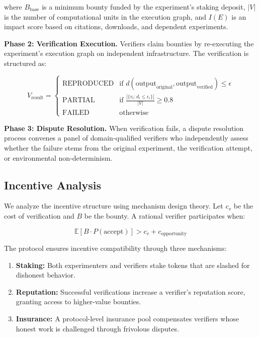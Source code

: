 \documentclass[11pt,a4paper]{article}
\begin{document}
\noindent where $B_{\text{base}}$ is a minimum bounty funded by the experiment's staking deposit, $|V|$ is the number of computational units in the execution graph, and $I(E)$ is an impact score based on citations, downloads, and dependent experiments.

\textbf{Phase 2: Verification Execution.}
Verifiers claim bounties by re-executing the experiment's execution graph on independent infrastructure.
The verification is structured as:

\begin{equation}
    V_{\text{result}} = \begin{cases}
        \text{REPRODUCED} & \text{if } d(\text{output}_{\text{original}}, \text{output}_{\text{verified}}) \leq \epsilon \\
        \text{PARTIAL} & \text{if } \frac{|\{v_i : d_i \leq \epsilon_i\}|}{|V|} \geq 0.8 \\
        \text{FAILED} & \text{otherwise}
    \end{cases}
\end{equation}

\textbf{Phase 3: Dispute Resolution.}
When verification fails, a dispute resolution process convenes a panel of domain-qualified verifiers who independently assess whether the failure stems from the original experiment, the verification attempt, or environmental non-determinism.

\subsection{Incentive Analysis}

We analyze the incentive structure using mechanism design theory.
Let $c_v$ be the cost of verification and $B$ be the bounty.
A rational verifier participates when:

\begin{equation}
    \mathbb{E}[B \cdot P(\text{accept})] > c_v + c_{\text{opportunity}}
\end{equation}

The protocol ensures incentive compatibility through three mechanisms:

\begin{enumerate}[leftmargin=*]
    \item \textbf{Staking:} Both experimenters and verifiers stake tokens that are slashed for dishonest behavior.
    \item \textbf{Reputation:} Successful verifications increase a verifier's reputation score, granting access to higher-value bounties.
    \item \textbf{Insurance:} A protocol-level insurance pool compensates verifiers whose honest work is challenged through frivolous disputes.
\end{enumerate}
\end{document}
